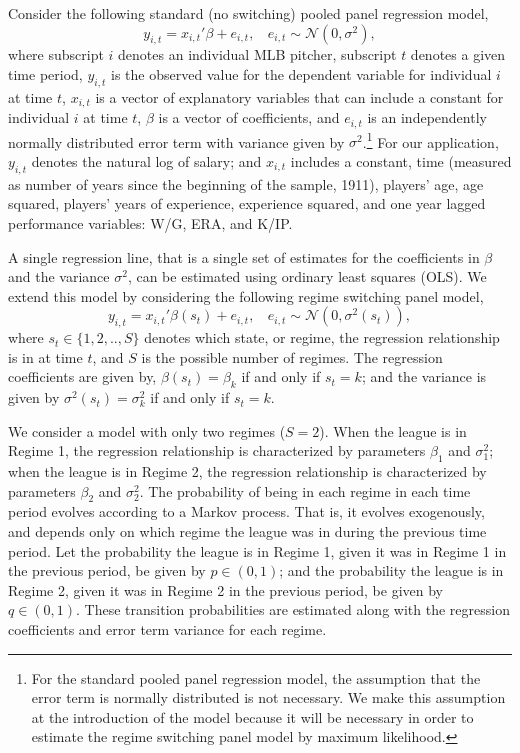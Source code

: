 \documentclass[12pt]{article}
\newcommand{\beq}{\begin{equation}}
\newcommand{\eeq}{\end{equation}}
\newcommand{\normal}{\mathcal{N}}
\begin{document}
Consider the following standard (no switching) pooled panel regression model,
\beq y_{i,t} = x_{i,t}'\beta + e_{i,t},~~~~ e_{i,t}\sim \normal(0,\sigma^2), \eeq
where subscript $i$ denotes an individual MLB pitcher, subscript $t$ denotes a given time period, $y_{i,t}$ is the observed value for the dependent variable for individual $i$ at time $t$, $x_{i,t}$ is a vector of explanatory variables that can include a constant for individual $i$ at time $t$, $\beta$ is a vector of coefficients, and $e_{i,t}$ is an independently normally distributed error term with variance given by $\sigma^2$.\footnote{For the standard pooled panel regression model, the assumption that the error term is normally distributed is not necessary.  We make this assumption at the introduction of the model because it will be necessary in order to estimate the regime switching panel model by maximum likelihood.}  For our application, $y_{i,t}$ denotes the natural log of salary; and $x_{i,t}$ includes a constant, time (measured as number of years since the beginning of the sample, 1911), players' age, age squared, players' years of experience, experience squared, and one year lagged performance variables: W/G, ERA, and K/IP. 

A single regression line, that is a single set of estimates for the coefficients in $\beta$ and the variance $\sigma^2$, can be estimated using ordinary least squares (OLS).  We extend this model by considering the following regime switching panel model,
\beq y_{i,t} = x_{i,t}'\beta(s_t) + e_{i,t}, ~~~~ e_{i,t}\sim \normal(0,\sigma^2(s_t)), \eeq
where $s_t\in \{1,2,..,S\}$ denotes which state, or regime, the regression relationship is in at time $t$, and $S$ is the possible number of regimes.  The regression coefficients are given by, $\beta(s_t) = \beta_k$ if and only if $s_t=k$; and the variance is given by $\sigma^2(s_t) = \sigma^2_k$ if and only if $s_t=k$.  

We consider a model with only two regimes ($S=2$).  When the league is in Regime 1, the regression relationship is characterized by parameters $\beta_1$ and $\sigma_1^2$; when the league is in Regime 2, the regression relationship is characterized by parameters $\beta_2$ and $\sigma_2^2$.  The probability of being in each regime in each time period evolves according to a Markov process.  That is, it evolves exogenously, and depends only on which regime the league was in during the previous time period.  Let the probability the league is in Regime 1, given it was in Regime 1 in the previous period, be given by $p\in(0,1)$; and the probability the league is in Regime 2, given it was in Regime 2 in the previous period, be given by $q\in(0,1)$.  These transition probabilities are estimated along with the regression coefficients and error term variance for each regime.
\end{document}
